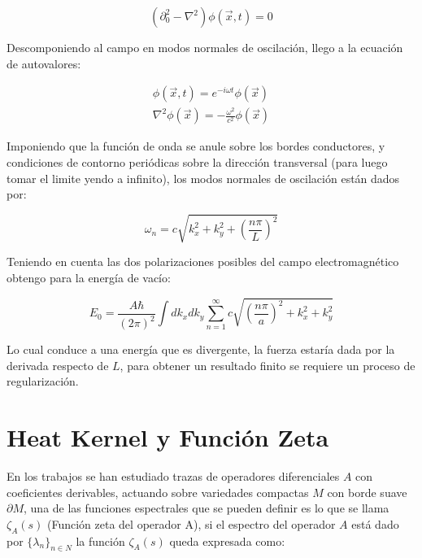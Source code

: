 \begin{equation}
( \partial _0 ^2 - \nabla  ^2  ) \phi (\vec{x} ,t) = 0 
\end{equation}

Descomponiendo al campo en modos normales de oscilación, llego a la ecuación de autovalores:

\begin{equation}
\begin{array}{c}
\phi ( \vec{x},t) = e ^{-i \omega t} \phi ( \vec{x}) \\
\nabla ^2 \phi ( \vec{x}) = - \frac{\omega ^2}{c ^2} \phi ( \vec{x})
\end{array}
\end{equation}

Imponiendo que la función de onda se anule sobre los bordes conductores, y condiciones de contorno periódicas sobre la dirección transversal (para luego tomar el limite yendo a infinito), los modos normales de oscilación están dados por:

\begin{equation}
\omega _n = c \sqrt{ k _x ^2 + k _y ^2 + \left( \frac{n \pi}{L} \right) ^2 }
\end{equation}

Teniendo en cuenta las dos polarizaciones posibles del campo electromagnético obtengo para la energía de vacío:

\begin{equation}
E _0 = \frac{A \hbar }{(2 \pi) ^2} \int dk _x dk _y 
\sum _{n=1} ^{\infty} 
c
\sqrt{
		\left( \frac{n \pi}{a } \right) ^2 + k _x ^2 + k _y ^2
		}
\end{equation}


Lo cual conduce a una energía que es divergente, la fuerza estaría dada por la derivada respecto de $L$, para obtener un resultado finito se requiere un proceso de regularización.

\section{Heat Kernel y Función Zeta}


En los trabajos \cite{ Seeley:1967ea,10.2307/2373309,10.2307/2373312} se han estudiado trazas de operadores diferenciales $A$ con coeficientes derivables, actuando sobre variedades compactas $M$ con borde suave $\partial M$, una de las funciones espectrales que se pueden definir es lo que se llama $\zeta _A (s)$ (Función zeta del operador A), si el espectro del operador $A$ está dado por $ \{ \lambda _n \} _{n \in N}$ la función $\zeta _A (s)$ queda expresada como:


